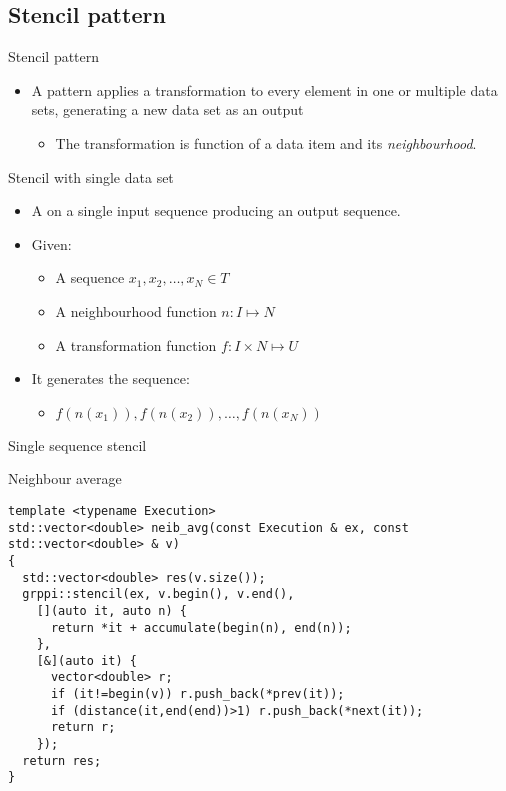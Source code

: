 \subsection{Stencil pattern}

\begin{frame}[t]{Stencil pattern}
\begin{itemize}
  \item A  pattern applies a transformation to every 
        element in one or multiple data sets, generating a new data set as an output
    \begin{itemize}
      \item The transformation is function of a data item and its \emph{neighbourhood}.
    \end{itemize}
\end{itemize}
\end{frame}

\begin{frame}[t]{Stencil with single data set}
\begin{itemize}
  \item A  on a single input sequence producing an output sequence.

  \vfill\pause
  \item Given:
    \begin{itemize}
      \item A sequence $x_1, x_2, \ldots, x_N \in T$
      \item A neighbourhood function $n: I \mapsto N$
      \item A transformation function $f: I \times N \mapsto U$
    \end{itemize}
  \vfill\pause
  \item It generates the sequence:
    \begin{itemize}
      \item $f(n(x_1)), f(n(x_2)), \ldots, f(n(x_N))$
    \end{itemize}
\end{itemize}
\end{frame}

\begin{frame}[t,fragile]{Single sequence stencil}
\begin{block}{Neighbour average}
\begin{lstlisting}
template <typename Execution>
std::vector<double> neib_avg(const Execution & ex, const std::vector<double> & v)
{
  std::vector<double> res(v.size());
  grppi::stencil(ex, v.begin(), v.end(), 
    [](auto it, auto n) {
      return *it + accumulate(begin(n), end(n)); 
    },
    [&](auto it) {
      vector<double> r;
      if (it!=begin(v)) r.push_back(*prev(it));
      if (distance(it,end(end))>1) r.push_back(*next(it));
      return r;
    });
  return res;
}
\end{lstlisting}
\end{block}
\end{frame}


